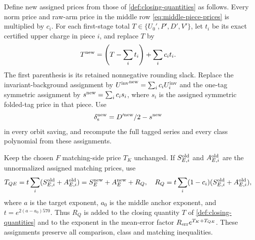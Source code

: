 \begin{lemma}\label{lem:four-routes-normalized}
Define new assigned prices from those of \cref{def:closing-quantities} as follows.
Every norm price and raw-arm price in the middle row
\eqref{eq:middle-piece-prices} is multiplied by $c_i$. For each first-stage
total $T\in\{U_0',P',D',V'\}$, let $t_i$ be its exact certified upper
charge in piece $i$, and replace $T$ by
\begin{equation}\label{eq:four-routes-first}
 T^{\rm new}=\left(T-\sum_i t_i\right)+\sum_i c_i t_i.
\end{equation}
The first parenthesis is its retained nonnegative rounding slack.
Replace the invariant-background assignment by
${U^{\mathrm{inv}}}^{\rm new}=\sum_i c_iU^{\mathrm{inv}}_i$ and the one-tag symmetric
assignment by $s^{\rm new}=\sum_i c_i s_i$, where $s_i$ is the assigned
symmetric folded-tag price in that piece. Use
\[
 \delta_{\rm s}^{\rm new}=D^{\prime\rm new}/2-s^{\rm new}
\]
in every orbit saving, and recompute the full tagged series and every
class polynomial from these assignments.

Keep the chosen $F$ matching-side price $T_K$ unchanged. If
$S_{E,i}^{\rm old}$ and $A_{E,i}^{\rm old}$ are the unnormalized
assigned matching prices, use
\begin{equation}\label{eq:four-routes-q-reserve}
 T_{QE}=t\sum_i(S_{E,i}^{\rm old}+A_{E,i}^{\rm old})
       =S_E^{\rm new}+A_E^{\rm new}+R_Q,
 \quad
 R_Q=t\sum_i(1-c_i)(S_{E,i}^{\rm old}+A_{E,i}^{\rm old}),
\end{equation}
where $a$ is the target exponent, $a_0$ is the middle anchor exponent, and $t=e^{2(a-a_0)570}$. Thus $R_Q$ is added to the closing quantity $T$ of \cref{def:closing-quantities} and to the exponent in the mean-error factor $R_{\rm err}e^{T_K+T_{QE}}$. These assignments preserve all
comparison, class and matching inequalities.
\end{lemma}

